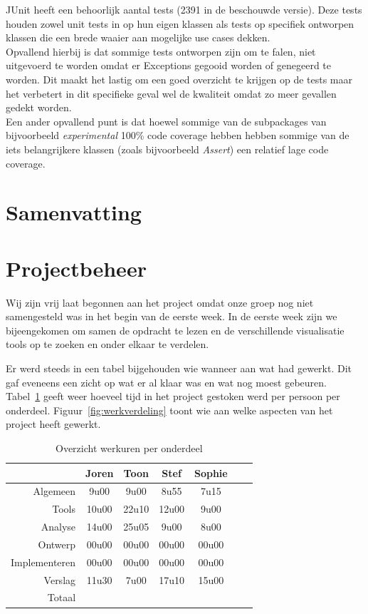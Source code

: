 \documentclass[i1]{oss}
\begin{document}
JUnit heeft een behoorlijk aantal tests (2391 in de beschouwde versie). Deze tests houden zowel unit tests in op hun eigen klassen als tests op specifiek ontworpen klassen die een brede waaier aan mogelijke use cases dekken.
\\
Opvallend hierbij is dat sommige tests ontworpen zijn om te falen, niet uitgevoerd te worden omdat er Exceptions gegooid worden of genegeerd te worden. Dit maakt het lastig om een goed overzicht te krijgen op de tests maar het verbetert in dit specifieke geval wel de kwaliteit omdat zo meer gevallen gedekt worden.
\\
Een ander opvallend punt is dat hoewel sommige van de subpackages van bijvoorbeeld \emph{experimental} 100\% code coverage hebben hebben sommige van de iets belangrijkere klassen (zoals bijvoorbeeld \emph{Assert}) een relatief lage code coverage.

\section{Samenvatting}

\section{Projectbeheer}

Wij zijn vrij laat begonnen aan het project omdat onze groep nog niet samengesteld was in het begin van de eerste week. In de eerste week zijn we bijeengekomen om samen de opdracht te lezen en de verschillende visualisatie tools op te zoeken en onder elkaar te verdelen. 

Er werd steeds in een tabel bijgehouden wie wanneer aan wat had gewerkt. Dit gaf eveneens een zicht op wat er al klaar was en wat nog moest gebeuren. \\
Tabel~\ref{tab:werkuren} geeft weer hoeveel tijd in het project gestoken werd per persoon per onderdeel. Figuur~\ref{fig:werkverdeling} toont wie aan welke aspecten van het project heeft gewerkt.

\begin{table}[h]
\begin{center}
    \begin{tabular}{ r | c  c  c  c  c  c}
     & Joren & Toon & Stef & Sophie \\ \hline
    Algemeen & 9u00 & 9u00 & 8u55 & 7u15\\
   	Tools & 10u00 & 22u10 & 12u00 & 9u00 \\
	Analyse & 14u00 & 25u05 & 9u00 & 8u00 \\
	Ontwerp & 00u00 & 00u00 & 00u00 & 00u00 \\
	Implementeren & 00u00 & 00u00 & 00u00 & 00u00\\
	Verslag & 11u30 & 7u00 & 17u10 & 15u00 \\
	Totaal & & & & 
    \end{tabular}
    \caption{Overzicht werkuren per onderdeel}
    \label{tab:werkuren}
\end{center}
\end{table}
\end{document}
